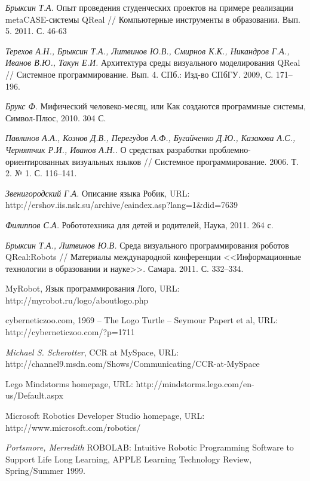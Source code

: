 \documentclass[a4paper]{article}
\begin{document}
\begin{thebibliography}{9001}
   \emph{Брыксин Т.А.} Опыт проведения студенческих проектов на примере реализации metaCASE-системы QReal // Компьютерные инструменты в образовании. Вып. 5. 2011. С. 46-63

   \emph{Терехов А.Н., Брыксин Т.А., Литвинов Ю.В., Смирнов К.К., Никандров Г.А., Иванов В.Ю., Такун Е.И.} Архитектура среды визуального моделирования QReal // Системное программирование. Вып. 4. СПб.: Изд-во СПбГУ. 2009, С. 171--196.

   \emph{Брукс Ф.} Мифический человеко-месяц, или Как создаются программные системы, Символ-Плюс, 2010. 304 С.

   \emph{Павлинов А.А., Кознов Д.В., Перегудов А.Ф., Бугайченко Д.Ю., Казакова А.С., Чернятчик Р.И., Иванов А.Н..} О средствах разработки проблемно-ориентированных визуальных языков // Системное программирование. 2006. Т. 2. № 1. С. 116--141.

   \emph{Звенигородский Г.А.} Описание языка Робик, URL: http://ershov.iis.nsk.su/archive/eaindex.asp?lang=1\&did=7639 

   \emph{Филиппов С.А.} Робототехника для детей и родителей, Наука, 2011. 264 с.

   \emph{Брыксин Т.А., Литвинов Ю.В.} Среда визуального программирования роботов QReal:Robots // Материалы международной конференции <<Информационные технологии в образовании и науке>>. Самара. 2011. С. 332--334.

   MyRobot, Язык программирования Лого, URL: http://myrobot.ru/logo/aboutlogo.php   

   cyberneticzoo.com, 1969 – The Logo Turtle – Seymour Papert et al, URL: http://cyberneticzoo.com/?p=1711 

   \emph{Michael S. Scherotter}, CCR at MySpace, URL: http://channel9.msdn.com/Shows/Communicating/CCR-at-MySpace 

   Lego Mindstorms homepage, URL: http://mindstorms.lego.com/en-us/Default.aspx

   Microsoft Robotics Developer Studio homepage, URL: http://www.microsoft.com/robotics/ 

   \emph{Portsmore, Merredith} ROBOLAB: Intuitive Robotic Programming Software to Support Life Long Learning, APPLE Learning Technology Review, Spring/Summer 1999.


\end{thebibliography}
\end{document}
